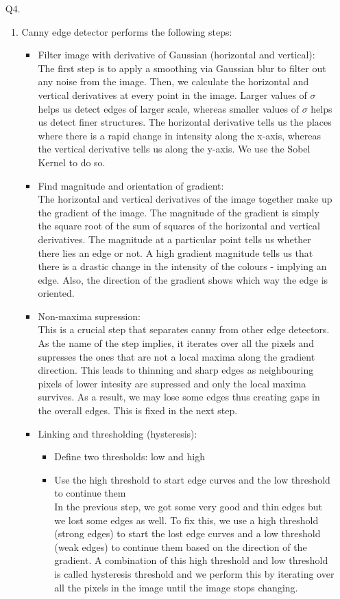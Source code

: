 \documentclass{csc_assignment4}
\begin{document}
\begin{description}
\begin{enumerate}[label=(\alph*)]
\item[Q4.]
\begin{enumerate}[label=(\alph*)]
\item Canny edge detector performs the following steps: \\
\begin{itemize}
\item Filter image with derivative of Gaussian (horizontal and vertical):\\
The first step is to apply a smoothing via Gaussian blur to filter out any noise from the image. Then, we calculate the horizontal and vertical derivatives at every point in the image. Larger values of $\sigma$ helps us detect edges of larger scale, whereas smaller values of $\sigma$ helps us detect finer structures. The horizontal derivative tells us the places where there is a rapid change in intensity along the x-axis, whereas the vertical derivative tells us along the y-axis. We use the Sobel Kernel to do so. 
\item Find magnitude and orientation of gradient: \\
The horizontal and vertical derivatives of the image together make up the gradient of the image. The magnitude of the gradient is simply the square root of the sum of squares of the horizontal and vertical derivatives. The magnitude at a particular point tells us whether there lies an edge or not. A high gradient magnitude tells us that there is a drastic change in the intensity of the colours - implying an edge. Also, the direction of the gradient shows which way the edge is oriented.
\item Non-maxima supression: \\
This is a crucial step that separates canny from other edge detectors. As the name of the step implies, it iterates over all the pixels and supresses the ones that are not a local maxima along the gradient direction. This leads to thinning and sharp edges as neighbouring pixels of lower intesity are supressed and only the local maxima survives. As a result, we may lose some edges thus creating gaps in the overall edges. This is fixed in the next step. 
\item Linking and thresholding (hysteresis): \begin{itemize}
\item Define two thresholds: low and high
\item Use the high threshold to start edge curves and the low threshold to continue them \\
In the previous step, we got some very good and thin edges but we lost some edges as well. To fix this, we use a high threshold (strong edges) to start the lost edge curves and a low threshold (weak edges) to continue them based on the direction of the gradient. A combination of this high threshold and low threshold is called hysteresis threshold and we perform this by iterating over all the pixels in the image until the image stops changing. 

\end{itemize}
\end{itemize}
\end{enumerate}
\end{enumerate}
\end{description}
\end{document}
